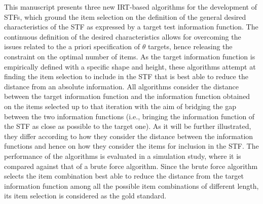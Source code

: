 \documentclass[12pt, a4paper, titilepage]{article}
\begin{document}

 

This manuscript presents three new IRT-based algorithms for the development of STFs, which ground the item selection on the definition of the general desired characteristics of the STF as expressed by a target test information function. The continuous definition of the desired characteristics allows for overcoming the issues related to the a priori specification of $\theta$ targets, hence releasing the constraint on the optimal number of items. As the  target information function is empirically defined with a specific shape and height, these algorithms attempt at finding the item selection to include in the STF that is best able to reduce the distance from an absolute information.
All algorithms consider the distance between the target information function and the information function obtained on the items selected up to that iteration with the aim of bridging the gap between the two information functions (i.e., bringing the information function of the STF as close as possible to the target one). As it will be further illustrated, they differ according to how they consider the distance between the information functions and hence on how they consider the items for inclusion in the STF. The performance of the algorithms is evaluated in a simulation study, where it is compared against that of a brute force algorithm. 
Since the brute force algorithm selects the item combination best able to reduce the distance from the target information function among all the possible item combinations of different length, its item selection is considered as the gold standard. 
\end{document}
